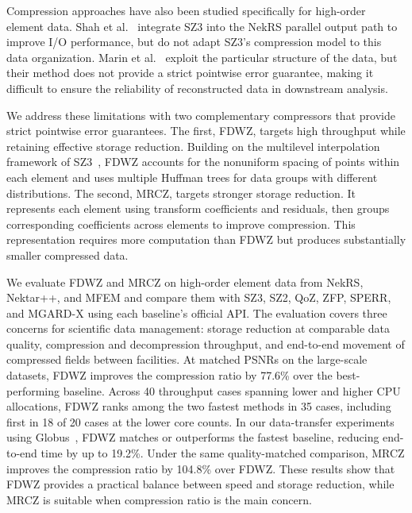 Compression approaches have also been studied specifically for high-order element data. Shah et al.~\cite{shah2026solver} integrate SZ3 into the NekRS parallel output path to improve I/O performance, but do not adapt SZ3's compression model to this data organization. Marin et al.~\cite{marin2016spectral} exploit the particular structure of the data, but their method does not provide a strict pointwise error guarantee, making it difficult to ensure the reliability of reconstructed data in downstream analysis.

We address these limitations with two complementary compressors that provide strict pointwise error guarantees. The first, FDWZ, targets high throughput while retaining effective storage reduction. Building on the multilevel interpolation framework of SZ3~\cite{liang2023sz3,zhao2021optimizing}, FDWZ accounts for the nonuniform spacing of points within each element and uses multiple Huffman trees for data groups with different distributions. The second, MRCZ, targets stronger storage reduction. It represents each element using transform coefficients and residuals, then groups corresponding coefficients across elements to improve compression. This representation requires more computation than FDWZ but produces substantially smaller compressed data.

We evaluate FDWZ and MRCZ on high-order element data from NekRS, Nektar++, and MFEM and compare them with SZ3, SZ2, QoZ, ZFP, SPERR, and MGARD-X using each baseline's official API. The evaluation covers three concerns for scientific data management: storage reduction at comparable data quality, compression and decompression throughput, and end-to-end movement of compressed fields between facilities. At matched PSNRs on the large-scale datasets, FDWZ improves the compression ratio by 77.6\% over the best-performing baseline. Across 40 throughput cases spanning lower and higher CPU allocations, FDWZ ranks among the two fastest methods in 35 cases, including first in 18 of 20 cases at the lower core counts. In our data-transfer experiments using Globus~\cite{chard2017globus}, FDWZ matches or outperforms the fastest baseline, reducing end-to-end time by up to 19.2\%. Under the same quality-matched comparison, MRCZ improves the compression ratio by 104.8\% over FDWZ. These results show that FDWZ provides a practical balance between speed and storage reduction, while MRCZ is suitable when compression ratio is the main concern.

